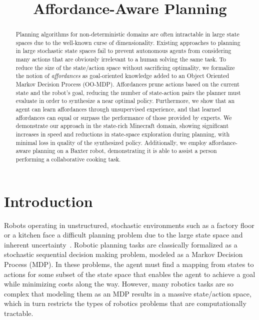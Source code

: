\documentclass[conference]{IEEEtran}
\begin{document}
\title{Affordance-Aware Planning}

\author{
}

\maketitle

\begin{abstract}
Planning algorithms for non-deterministic domains are often
intractable in large state spaces due to the well-known curse of
dimensionality. Existing approaches to planning in large stochastic
state spaces fail to prevent autonomous agents from considering many
actions that are obviously irrelevant to a human solving the same
task. To reduce the size of the state/action space without sacrificing
optimality, we formalize the notion of {\em affordances} as
goal-oriented knowledge added to an Object Oriented Markov Decision
Process (OO-MDP).  Affordances prune actions based on the current
state and the robot's goal, reducing the number of state-action pairs
the planner must evaluate in order to synthesize a near optimal
policy. Furthermore, we show that an agent can learn affordances through
unsupervised experience, and that learned affordances can equal or
surpass the performance of those provided by experts. We demonstrate
our approach in the state-rich Minecraft domain, showing significant
increases in speed and reductions in state-space exploration during
planning, with minimal loss in quality of the synthesized policy.
Additionally, we employ affordance-aware planning on a Baxter robot,
demonstrating it is able to assist a person performing a collaborative
cooking task.

\end{abstract}

\IEEEpeerreviewmaketitle

\section{Introduction}
\label{sec:introduction}

Robots operating in unstructured, stochastic environments such as a
factory floor or a kitchen face a difficult planning problem due to
the large state space and inherent
uncertainty~\citep{bollini12,knepper13}.  Robotic planning tasks are
classically formalized as a stochastic sequential decision making
problem, modeled as a Markov Decision Process (MDP). In these
problems, the agent must find a mapping from states to actions for
some subset of the state space that enables the agent to achieve a
goal while minimizing costs along the way. However, many robotics
tasks are so complex that modeling them as an MDP results in a massive
state/action space, which in turn restricts the types of robotics
problems that are computationally tractable.
 
\end{document}
